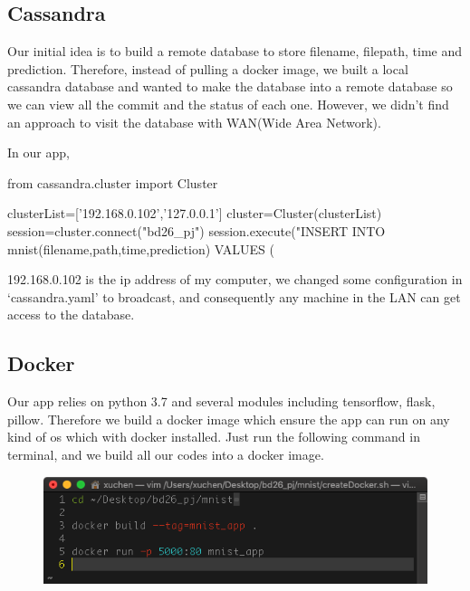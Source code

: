 \documentclass[12pt,hyperref,]{ctexart}
\begin{document}
\subsection{Cassandra}\label{cassandra}

Our initial idea is to build a remote database to store filename,
filepath, time and prediction. Therefore, instead of pulling a docker
image, we built a local cassandra database and wanted to make the
database into a remote database so we can view all the commit and the
status of each one. However, we didn't find an approach to visit the
database with WAN(Wide Area Network).

In our app,

\begin{python}
from cassandra.cluster import Cluster

clusterList=['192.168.0.102','127.0.0.1']
cluster=Cluster(clusterList)
session=cluster.connect("bd26_pj")
session.execute("INSERT INTO mnist(filename,path,time,prediction) VALUES
            (%
\end{python}

192.168.0.102 is the ip address of my computer, we changed some
configuration in `cassandra.yaml' to broadcast, and consequently any
machine in the LAN can get access to the database.

\subsection{Docker}\label{docker}

Our app relies on python 3.7 and several modules including tensorflow,
flask, pillow. Therefore we build a docker image which ensure the app
can run on any kind of os which with docker installed. Just run the
following command in terminal, and we build all our codes into a docker
image.

\begin{figure}[H]
\centering
\includegraphics[width=6in]{docker.png}
\label{create docker image}
\end{figure}
\end{document}
